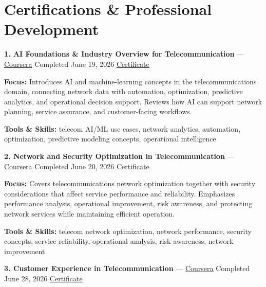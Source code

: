 \documentclass[9pt,letterpaper]{extarticle}
\begin{document}
\section{Certifications \& Professional Development}
\noindent\textbf{1. AI Foundations \& Industry Overview for Telecommunication} {\small --- \textcolor{blue}{\underline{\href{https://www.coursera.org/account/accomplishments/verify/3900EVOH4I1Y}{Coursera}}} \textbar{} Completed \textbar{} June 19, 2026 \textbar{} \textcolor{blue}{\underline{\href{https://waseemraza844.github.io/portfolio/certificates/wireless/c1-ai-found-indus-overview.pdf}{Certificate}}}}\par
\textbf{Focus:} Introduces AI and machine-learning concepts in the telecommunications domain, connecting network data with automation, optimization, predictive analytics, and operational decision support. Reviews how AI can support network planning, service assurance, and customer-facing workflows.\par
{\small\textbf{Tools \& Skills:} telecom AI/ML use cases, network analytics, automation, optimization, predictive modeling concepts, operational intelligence\par}
\vspace{2pt}
\noindent\textbf{2. Network and Security Optimization in Telecommunication} {\small --- \textcolor{blue}{\underline{\href{https://www.coursera.org/account/accomplishments/verify/4TQ51W1OQWRE}{Coursera}}} \textbar{} Completed \textbar{} June 20, 2026 \textbar{} \textcolor{blue}{\underline{\href{https://waseemraza844.github.io/portfolio/certificates/wireless/c2-net-sec-optim-tel.pdf}{Certificate}}}}\par
\textbf{Focus:} Covers telecommunications network optimization together with security considerations that affect service performance and reliability. Emphasizes performance analysis, operational improvement, risk awareness, and protecting network services while maintaining efficient operation.\par
{\small\textbf{Tools \& Skills:} telecom network optimization, network performance, security concepts, service reliability, operational analysis, risk awareness, network improvement\par}
\vspace{2pt}
\noindent\textbf{3. Customer Experience in Telecommunication} {\small --- \textcolor{blue}{\underline{\href{https://www.coursera.org/account/accomplishments/verify/NXOIIASQQXKX}{Coursera}}} \textbar{} Completed \textbar{} June 28, 2026 \textbar{} \textcolor{blue}{\underline{\href{https://waseemraza844.github.io/portfolio/certificates/wireless/c3-cust-exp-telecom.pdf}{Certificate}}}}\par
\end{document}
